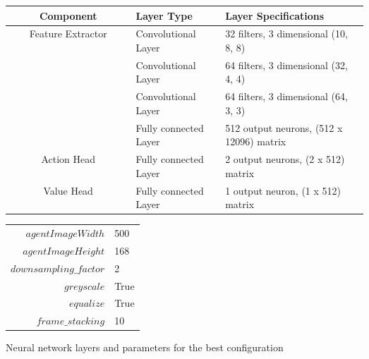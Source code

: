 \begin{figure}
    \begin{center}
        \begin{tabular}{|| c | p{0.25\linewidth} | p{0.4\linewidth} ||}
            \hline
            Component                          & Layer Type            & Layer Specifications                     \\ [0.5ex]
            \hline\hline
            \multirow{4}{*}{Feature Extractor} & Convolutional Layer   & 32 filters, 3 dimensional (10, 8, 8)     \\\cline{2-3}
                                               & Convolutional Layer   & 64 filters, 3 dimensional (32, 4, 4)     \\\cline{2-3}
                                               & Convolutional Layer   & 64 filters, 3 dimensional (64, 3, 3)     \\\cline{2-3}
                                               & Fully connected Layer & 512 output neurons, (512 x 12096) matrix \\
            \hline
            Action Head                        & Fully connected Layer & 2 output neurons, (2 x 512) matrix       \\
            \hline
            Value Head                         & Fully connected Layer & 1 output neuron, (1 x 512) matrix        \\
            \hline
        \end{tabular}
        \begin{tabular}{r@{: }l}
            $agentImageWidth$      & 500  \\
            $agentImageHeight$     & 168  \\
            $downsampling\_factor$ & 2    \\
            $greyscale$            & True \\
            $equalize$             & True \\
            $frame\_stacking$      & 10   \\
        \end{tabular}
    \end{center}
    \caption{Neural network layers and parameters for the best configuration}
    \label{fig:network_architecture}
\end{figure}

